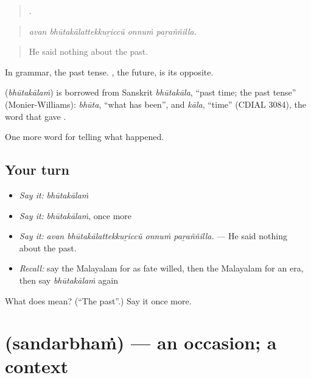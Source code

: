 \begin{quote}
   .
\end{quote}

\begin{quote}
\emph{avan bhūtakālattekkuṟiccŭ onnuṁ paṟaññilla.}
\end{quote}

\begin{quote}
He said nothing about the past.
\end{quote}

In grammar, the past tense. , the future, is its opposite.

\begin{cousinweb}
\textbf{} (\emph{bhūtakālaṁ}) is borrowed from Sanskrit \emph{bhūtakāla}, \textquotedblleft{}past time; the past tense\textquotedblright{} (Monier-Williams): \emph{bhūta}, \textquotedblleft{}what has been\textquotedblright{}, and \emph{kāla}, \textquotedblleft{}time\textquotedblright{} (CDIAL 3084), the word that gave .
\end{cousinweb}

\begin{grammarlens}[title={What you've built}]
One more word for telling what happened.
\end{grammarlens}

\subsection*{Your turn}
\begin{itemize}
\raggedright
  \item \emph{Say it:} \emph{bhūtakālaṁ}
  \item \emph{Say it:} \emph{bhūtakālaṁ}, once more
  \item \emph{Say it:} \emph{avan bhūtakālattekkuṟiccŭ onnuṁ paṟaññilla.} — He said nothing about the past.
  \item \emph{Recall:} say the Malayalam for as fate willed, then the Malayalam for an era, then say \emph{bhūtakālaṁ} again
\end{itemize}

\begin{tcolorbox}[breakable,colback=teal!4,colframe=teal!35!black,title={Before you move on}]
What does  mean? (\textquotedblleft{}The past\textquotedblright{}.) Say it once more.
\end{tcolorbox}
\section[\texorpdfstring{\ml{സന്ദർഭം} (sandarbhaṁ)}{സന്ദർഭം (sandarbhaṁ)}]{ (sandarbhaṁ) — an occasion; a context}

